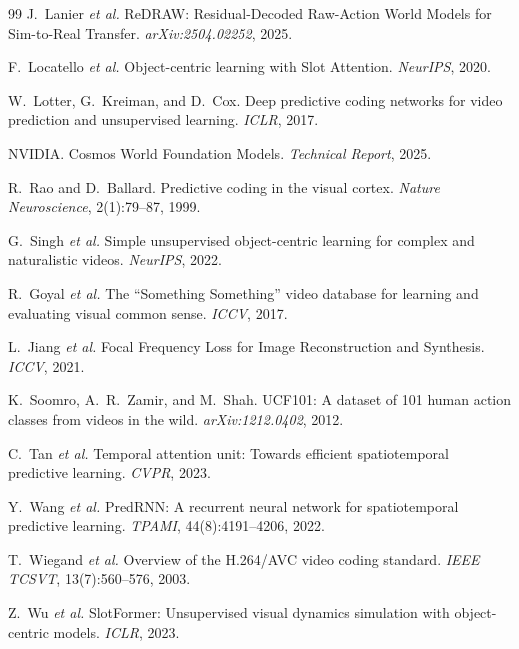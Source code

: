 \documentclass{article}
\begin{document}
\begin{thebibliography}{99}
J.~Lanier \textit{et al.}
\newblock ReDRAW: Residual-Decoded Raw-Action World Models for Sim-to-Real Transfer.
\newblock \textit{arXiv:2504.02252}, 2025.

F.~Locatello \textit{et al.}
\newblock Object-centric learning with Slot Attention.
\newblock \textit{NeurIPS}, 2020.

W.~Lotter, G.~Kreiman, and D.~Cox.
\newblock Deep predictive coding networks for video prediction and unsupervised learning.
\newblock \textit{ICLR}, 2017.

NVIDIA.
\newblock Cosmos World Foundation Models.
\newblock \textit{Technical Report}, 2025.

R.~Rao and D.~Ballard.
\newblock Predictive coding in the visual cortex.
\newblock \textit{Nature Neuroscience}, 2(1):79--87, 1999.

G.~Singh \textit{et al.}
\newblock Simple unsupervised object-centric learning for complex and naturalistic videos.
\newblock \textit{NeurIPS}, 2022.

R.~Goyal \textit{et al.}
\newblock The ``Something Something'' video database for learning and evaluating visual common sense.
\newblock \textit{ICCV}, 2017.

L.~Jiang \textit{et al.}
\newblock Focal Frequency Loss for Image Reconstruction and Synthesis.
\newblock \textit{ICCV}, 2021.

K.~Soomro, A.~R.~Zamir, and M.~Shah.
\newblock UCF101: A dataset of 101 human action classes from videos in the wild.
\newblock \textit{arXiv:1212.0402}, 2012.

C.~Tan \textit{et al.}
\newblock Temporal attention unit: Towards efficient spatiotemporal predictive learning.
\newblock \textit{CVPR}, 2023.

Y.~Wang \textit{et al.}
\newblock PredRNN: A recurrent neural network for spatiotemporal predictive learning.
\newblock \textit{TPAMI}, 44(8):4191--4206, 2022.

T.~Wiegand \textit{et al.}
\newblock Overview of the H.264/AVC video coding standard.
\newblock \textit{IEEE TCSVT}, 13(7):560--576, 2003.

Z.~Wu \textit{et al.}
\newblock SlotFormer: Unsupervised visual dynamics simulation with object-centric models.
\newblock \textit{ICLR}, 2023.


\end{thebibliography}
\end{document}
